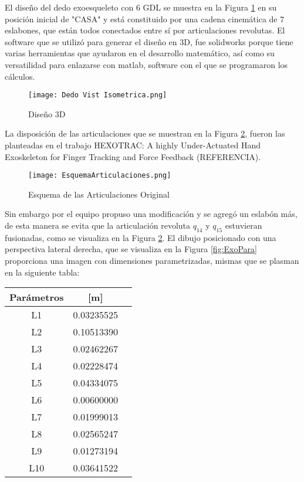El diseño del dedo exoesqueleto con 6 GDL se muestra en la Figura \ref{fig:Diseno3D} en su 
posición inicial de "CASA" y está constituido por una cadena cinemática de 7 eslabones, que 
están todos conectados entre sí por articulaciones revolutas. El software que se utilizó para 
generar el diseño en 3D, fue solidworks porque tiene varias herramientas que ayudaron en el 
desarrollo matemático, así como su versatilidad para enlazarse con matlab, software con el que 
se programaron los cálculos.  

\begin{figure}[H]
    \centering
    \texttt{[image: Dedo Vist Isometrica.png]} 
    \caption{Diseño 3D}
    \label{fig:Diseno3D}
\end{figure}

La disposición de las articulaciones que se muestran en la Figura \ref{fig:EsqArtOri}, fueron las 
planteadas en el trabajo HEXOTRAC: A highly Under-Actuated Hand Exoskeleton for Finger Tracking 
and Force Feedback (REFERENCIA).

\begin{figure} [H]
    \centering
    \texttt{[image: EsquemaArticulaciones.png]} 
    \caption{Esquema de las Articulaciones Original}
    \label{fig:EsqArtOri}
\end{figure}

Sin embargo por el equipo propuso una modificación y se agregó un eslabón más, de esta manera 
se evita que la articulación revoluta  $q_{14}$ y  $q_{15}$ estuvieran fusionadas, como se 
visualiza en la Figura \ref{fig:EsqArtOri}. El dibujo posicionado con una perspectiva lateral 
derecha, que se visualiza en la Figura \ref{fig:ExoPara} proporciona una imagen con dimensiones 
parametrizadas, mismas que se plasman en la siguiente tabla: 

\begin{table}[!ht] %
    \centering
    \begin{center}
        \begin{tabular}{ccc}
        Parámetros & [m] \\
        \hline \hline 
        L1 & 0.03235525  \\ 
        L2 & 0.10513390  \\
        L3 & 0.02462267  \\
        L4 & 0.02228474  \\
        L5 & 0.04334075  \\
        L6 & 0.00600000  \\
        L7 & 0.01999013  \\
        L8 & 0.02565247  \\
        L9 & 0.01273194  \\
        L10 & 0.03641522 \\
        \end{tabular}
    \end{center}
\end{table}

